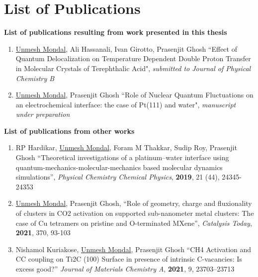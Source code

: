 \chapter{List of Publications}\label{mypublications}
\textbf{List of publications resulting from work presented in this thesis}
\begin{enumerate}

\item \underline{Unmesh Mondal}, Ali Hassanali, Ivan Girotto, Prasenjit Ghosh
 ``Effect of Quantum Delocalization on Temperature Dependent Double Proton Transfer in Molecular Crystals of Terephthalic Acid", \emph{submitted to Journal of Physical Chemistry B}
 
\item \underline{Unmesh Mondal}, Prasenjit Ghosh
``Role of Nuclear Quantum Fluctuations on an electrochemical interface: the case of Pt(111) and water", \emph{manuscript under preparation}
 
   
\end{enumerate}
\noindent \textbf{List of publications from other works}
\begin{enumerate}

\item RP Hardikar, \underline{Unmesh Mondal}, Foram M Thakkar, Sudip Roy, Prasenjit Ghosh
``Theoretical investigations of a platinum–water interface using  quantum-mechanics-molecular-mechanics based molecular dynamics simulations'',\emph{ Physical Chemistry Chemical Physics}, \textbf{2019}, 21 (44), 24345-24353

\item \underline{Unmesh Mondal}, Prasenjit Ghosh, 
 ``Role of geometry, charge and fluxionality of clusters in CO2 activation on supported sub-nanometer metal clusters: The case of Cu tetramers on pristine and O-terminated MXene'',\emph{ Catalysis Today}, \textbf{2021}, 370, 93-103

  \item Nishamol Kuriakose, \underline{Unmesh Mondal}, Prasenjit Ghosh
  ``CH4 Activation and CC coupling on Ti2C (100) Surface in presence of intrinsic C-vacancies: Is excess good?''\emph{ Journal of Materials Chemistry A}, \textbf{2021}, 9, 23703–23713  
   

\end{enumerate}



